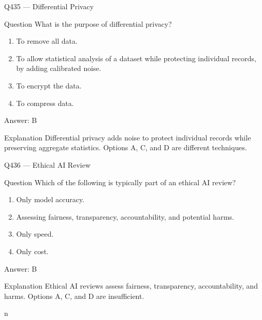 \documentclass[aspectratio=169,8pt]{beamer}
\begin{document}
	\begin{frame}{Q435 --- Differential Privacy}
		\begin{block}{Question}
			What is the purpose of differential privacy?
			\begin{enumerate}
				\item To remove all data.
				\item To allow statistical analysis of a dataset while protecting individual records, by adding calibrated noise.
				\item To encrypt the data.
				\item To compress data.
			\end{enumerate}
		\end{block}
		\begin{exampleblock}{Answer: B}\end{exampleblock}
		\begin{block}{Explanation}
			Differential privacy adds noise to protect individual records while preserving aggregate statistics. Options A, C, and D are different techniques.
		\end{block}
	\end{frame}
	
	\begin{frame}{Q436 --- Ethical AI Review}
		\begin{block}{Question}
			Which of the following is typically part of an ethical AI review?
			\begin{enumerate}
				\item Only model accuracy.
				\item Assessing fairness, transparency, accountability, and potential harms.
				\item Only speed.
				\item Only cost.
			\end{enumerate}
		\end{block}
		\begin{exampleblock}{Answer: B}\end{exampleblock}
		\begin{block}{Explanation}
			Ethical AI reviews assess fairness, transparency, accountability, and harms. Options A, C, and D are insufficient.
		\end{block}
	\end{frame}
	
n
	
\end{document}
